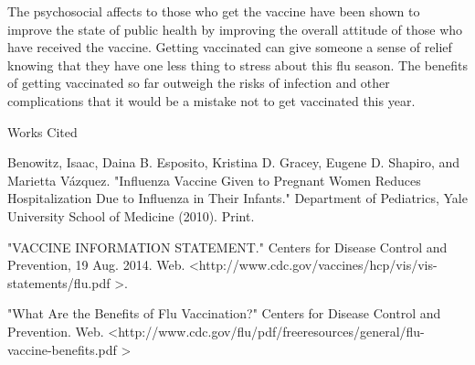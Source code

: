 \documentclass[12pt]{article}
\newcommand{\bibent}{\noindent \hangindent 40pt}
\newenvironment{workscited}{\newpage \begin{center} Works Cited \end{center}}{\newpage }
\begin{document}
\begin{flushleft}
The psychosocial affects to those who get the vaccine have been shown to improve the state of public health by improving the overall attitude of those who have received the vaccine. Getting vaccinated can give someone a sense of relief knowing that they have one less thing to stress about this flu season. The benefits of getting vaccinated so far outweigh the risks of infection and other complications that it would be a mistake not to get vaccinated this year.





\newpage

%
%
%
%
%
%
%
%
%
\begin{workscited}

\bibent
Benowitz, Isaac, Daina B. Esposito, Kristina D. Gracey, Eugene D. Shapiro, and Marietta Vázquez. "Influenza Vaccine Given to Pregnant Women Reduces Hospitalization Due to Influenza in Their Infants." Department of Pediatrics, Yale University School of Medicine (2010). Print.

\bibent
"VACCINE INFORMATION STATEMENT." Centers for Disease Control and Prevention, 19 Aug. 2014. Web. \textless http://www.cdc.gov/vaccines/hcp/vis/vis-statements/flu.pdf \textgreater.

\bibent
"What Are the Benefits of Flu Vaccination?" Centers for Disease Control and Prevention. Web. \textless http://www.cdc.gov/flu/pdf/freeresources/general/flu-vaccine-benefits.pdf \textgreater



\end{workscited}

\end{flushleft}
\end{document}
